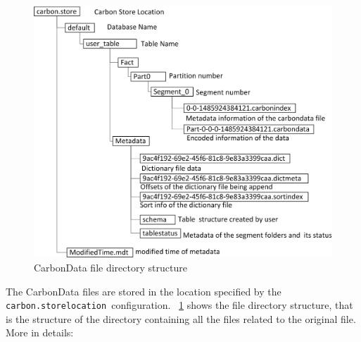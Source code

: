 \documentclass[10pt, a4paper]{report}
\begin{document}
\begin{figure}
	\centering
	\includegraphics[width=13cm]{./assets/img/carbondata/carbondata_file_directory_structure.png}
	\caption{CarbonData file directory structure}
	\label{fig:carbondata_file_directory_structure}
	\vspace{0.5cm}
\end{figure}

The CarbonData files are stored in the location specified by the\texttt{ carbon.storelocation }configuration. \figurename~\ref{fig:carbondata_file_directory_structure} shows the file directory structure, that is the structure of the directory containing all the files related to the original file. More in details: \\
\end{document}
